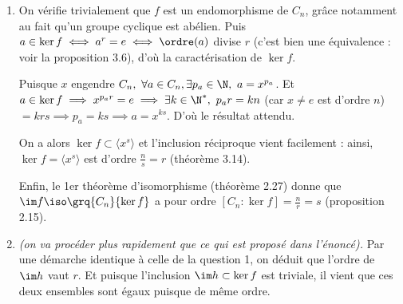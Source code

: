 \begin{enumerate}
  \item On vérifie trivialement que $f$ est un endomorphisme de $C_n$, grâce notamment au fait qu'un groupe cyclique est abélien.
  Puis $a\in \ker f \iff a^r = e \iff \ordre(a)$ divise $r$ (c'est bien une équivalence  : voir la proposition 3.6), d'où la caractérisation de $\ker f$.
  
  Puisque $x$ engendre $C_n,~ \forall a\in C_n, \exists p_a\in \N,~ a = x^{p_a}$. Et $a\in \ker f \implies x^{p_a r} = e \implies \exists k\in \N^*,~ p_a r = k n$ (car $x\neq e$ est d'ordre $n$) $=krs\implies p_a = ks \implies a = x^{ks}$. D'où le résultat attendu.
  
  On a alors $\ker f \subset \langle x^s\rangle$ et l'inclusion réciproque vient facilement : ainsi, $\ker f = \langle x^s\rangle$ est d'ordre $\frac{n}{s} = r$ (théorème 3.14).
  
  Enfin, le 1er théorème d'isomorphisme (théorème 2.27) donne que $\im f \iso \grq{C_n}{\ker f}$ a pour ordre $\left[C_n : \ker f \right] = \frac{n}{r} = s$ (proposition 2.15).
  
  \item \emph{(on va procéder plus rapidement que ce qui est proposé dans l'énoncé).} Par une démarche identique à celle de la question 1, on déduit que l'ordre de $\im h$ vaut $r$. Et puisque l'inclusion $\im h \subset \ker f$ est triviale, il vient que ces deux ensembles sont égaux puisque de même ordre.
  
\end{enumerate}
